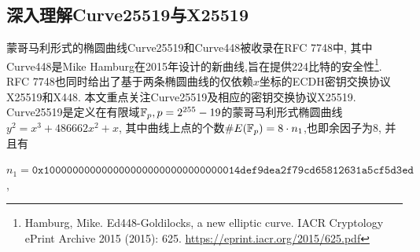 \subsection{深入理解Curve25519与X25519}

蒙哥马利形式的椭圆曲线Curve25519和Curve448被收录在RFC 7748中,
其中Curve448是Mike Hamburg在2015年设计的新曲线,旨在提供224比特的安全性\footnote{
Hamburg, Mike. Ed448-Goldilocks, a new elliptic curve. IACR Cryptology ePrint Archive 2015 (2015): 625.
\url{https://eprint.iacr.org/2015/625.pdf}}.
RFC 7748也同时给出了基于两条椭圆曲线的仅依赖$x$坐标的ECDH密钥交换协议X25519和X448.
本文重点关注Curve25519及相应的密钥交换协议X25519.
Curve25519是定义在有限域$\mathbb{F}_p, p = 2^{255}-19$的蒙哥马利形式椭圆曲线$y^2 = x^3 + 486662x^2 + x$,
其中曲线上点的个数$\#E(\mathbb{F}_p) = 8 \cdot n_1$,也即余因子为8, 并且有\\
\centerline{$n_1=\texttt{0x1000000000000000000000000000000014def9dea2f79cd65812631a5cf5d3ed}$,}


